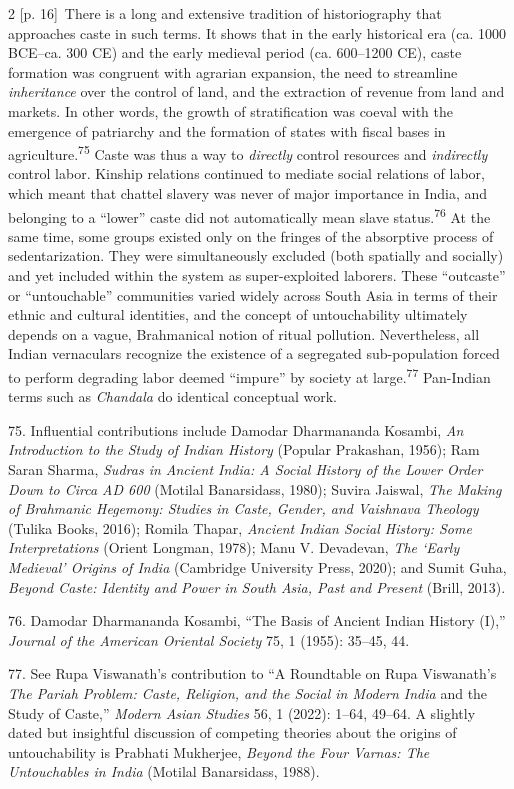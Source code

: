 \documentclass[10pt,a4paper]{article}
\begin{document}
\begin{paracol}{2}
\switchcolumn
{\scriptsize\color{gray} [p. 16]}\ There is a long and extensive tradition of historiography that approaches caste in such terms. It shows that in the early historical era (ca. 1000 BCE–ca. 300 CE) and the early medieval period (ca. 600–1200 CE), caste formation was congruent with agrarian expansion, the need to streamline \textit{inheritance} over the control of land, and the extraction of revenue from land and markets. In other words, the growth of stratification was coeval with the emergence of patriarchy and the formation of states with fiscal bases in agriculture.\nobreak\textsuperscript{75} Caste was thus a way to \textit{directly} control resources and \textit{indirectly} control labor. Kinship relations continued to mediate social relations of labor, which meant that chattel slavery was never of major importance in India, and belonging to a “lower” caste did not automatically mean slave status.\nobreak\textsuperscript{76} At the same time, some groups existed only on the fringes of the absorptive process of sedentarization. They were simultaneously excluded (both spatially and socially) and yet included within the system as super-exploited laborers. These “outcaste” or “untouchable” communities varied widely across South Asia in terms of their ethnic and cultural identities, and the concept of untouchability ultimately depends on a vague, Brahmanical notion of ritual pollution. Nevertheless, all Indian vernaculars recognize the existence of a segregated sub-population forced to perform degrading labor deemed “impure” by society at large.\nobreak\textsuperscript{77} Pan-Indian terms such as \textit{Chandala} do identical conceptual work.\par{\small 75. Influential contributions include Damodar Dharmananda Kosambi, \textit{An Introduction to the Study of Indian History} (Popular Prakashan, 1956); Ram Saran Sharma, \textit{Sudras in Ancient India: A Social History of the Lower Order Down to Circa AD 600} (Motilal Banarsidass, 1980); Suvira Jaiswal, \textit{The Making of Brahmanic Hegemony: Studies in Caste, Gender, and Vaishnava Theology} (Tulika Books, 2016); Romila Thapar, \textit{Ancient Indian Social History: Some Interpretations} (Orient Longman, 1978); Manu V. Devadevan, \textit{The ‘Early Medieval’ Origins of India} (Cambridge University Press, 2020); and Sumit Guha, \textit{Beyond Caste: Identity and Power in South Asia, Past and Present} (Brill, 2013).\par}{\small 76. Damodar Dharmananda Kosambi, “The Basis of Ancient Indian History (I),” \textit{Journal of the American Oriental Society} 75, 1 (1955): 35–45, 44.\par}{\small 77. See Rupa Viswanath’s contribution to “A Roundtable on Rupa Viswanath’s \textit{The Pariah Problem: Caste, Religion, and the Social in Modern India} and the Study of Caste,” \textit{Modern Asian Studies} 56, 1 (2022): 1–64, 49–64. A slightly dated but insightful discussion of competing theories about the origins of untouchability is Prabhati Mukherjee, \textit{Beyond the Four Varnas: The Untouchables in India} (Motilal Banarsidass, 1988).\par}

\end{paracol}
\end{document}
